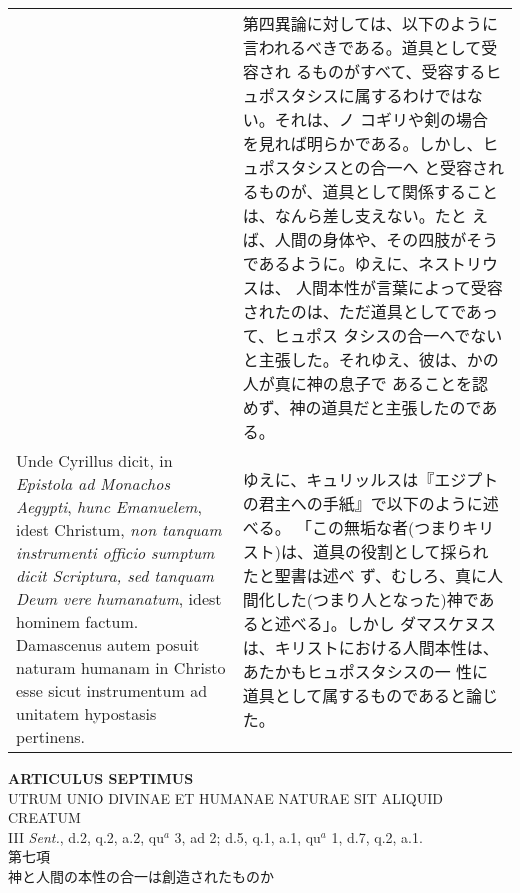 \documentclass[10pt]{jsarticle} %
\begin{document}
\begin{longtable}{p{21em}p{21em}}
&

第四異論に対しては、以下のように言われるべきである。道具として受容され
るものがすべて、受容するヒュポスタシスに属するわけではない。それは、ノ
コギリや剣の場合を見れば明らかである。しかし、ヒュポスタシスとの合一へ
と受容されるものが、道具として関係することは、なんら差し支えない。たと
えば、人間の身体や、その四肢がそうであるように。ゆえに、ネストリウスは、
人間本性が言葉によって受容されたのは、ただ道具としてであって、ヒュポス
タシスの合一へでないと主張した。それゆえ、彼は、かの人が真に神の息子で
あることを認めず、神の道具だと主張したのである。

\\



Unde Cyrillus dicit, in {\itshape Epistola ad Monachos Aegypti},
{\itshape hunc Emanuelem}, idest Christum, {\itshape non tanquam
instrumenti officio sumptum dicit Scriptura, sed tanquam Deum vere
humanatum}, idest hominem factum. Damascenus autem posuit naturam
humanam in Christo esse sicut instrumentum ad unitatem hypostasis
pertinens.

&

ゆえに、キュリッルスは『エジプトの君主への手紙』で以下のように述べる。
「この無垢な者(つまりキリスト)は、道具の役割として採られたと聖書は述べ
ず、むしろ、真に人間化した(つまり人となった)神であると述べる」。しかし
ダマスケヌスは、キリストにおける人間本性は、あたかもヒュポスタシスの一
性に道具として属するものであると論じた。





\end{longtable}
\newpage





\begin{center}
{\Large {\bf ARTICULUS SEPTIMUS}}\\ {\large UTRUM UNIO DIVINAE ET
HUMANAE NATURAE SIT ALIQUID CREATUM}\\ {\footnotesize III {\itshape
Sent.}, d.2, q.2, a.2, qu$^a$ 3, ad 2; d.5, q.1, a.1, qu$^a$ 1, d.7,
q.2, a.1.}\\ {\Large 第七項\\神と人間の本性の合一は創造されたものか}
\end{center}
\end{document}
